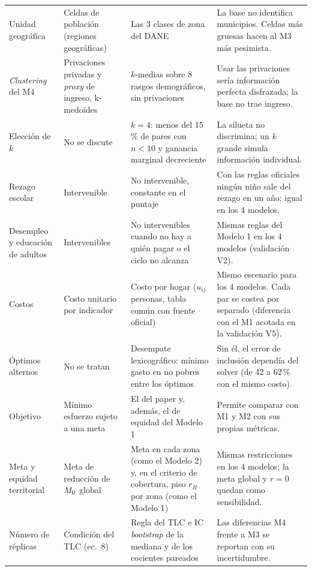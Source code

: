 {\begin{xltabular}{\textwidth}{@{}>{\raggedright\arraybackslash}p{2.3cm}>{\raggedright\arraybackslash}p{2.9cm}>{\raggedright\arraybackslash}p{3.6cm}X@{}}
Unidad geográfica & Celdas de población (regiones geográficas) & Las 3 clases de zona del DANE
  & La base no identifica municipios. Celdas más gruesas hacen al M3 más pesimista. \\
\emph{Clustering} del M4 & Privaciones privadas y \emph{proxy} de ingreso, k-medoides & $k$-medias sobre 8 rasgos demográficos, sin privaciones
  & Usar las privaciones sería información perfecta disfrazada; la base no trae ingreso. \\
Elección de $k$ & No se discute & $k=4$: menos del 15\,\% de pares con $n<10$ y ganancia marginal decreciente
  & La silueta no discrimina; un $k$ grande simula información individual. \\
Rezago escolar & Intervenible & No intervenible, constante en el puntaje
  & Con las reglas oficiales ningún niño sale del rezago en un año; igual en los 4 modelos. \\
Desempleo y educación de adultos & Intervenibles & No intervenibles cuando no hay a quién pagar o el ciclo no alcanza
  & Mismas reglas del Modelo 1 en los 4 modelos (validación V2). \\
Costos & Costo unitario por indicador & Costo por hogar ($u_{ij}$ personas, tabla común con fuente oficial)
  & Mismo escenario para los 4 modelos. Cada par se costea por separado (diferencia con el M1 acotada en la validación V5). \\
Óptimos alternos & No se tratan & Desempate lexicográfico: mínimo gasto en no pobres entre los óptimos
  & Sin él, el error de inclusión dependía del solver (de 42 a 62\,\% con el mismo costo). \\
Objetivo & Mínimo esfuerzo sujeto a una meta & El del paper y, además, el de equidad del Modelo 1
  & Permite comparar con M1 y M2 con sus propias métricas. \\
Meta y equidad territorial & Meta de reducción de $M_0$ global & Meta en cada zona (como el Modelo 2) y, en el criterio de cobertura, piso $r_B$ por zona (como el Modelo 1)
  & Mismas restricciones en los 4 modelos; la meta global y $r=0$ quedan como sensibilidad. \\
Número de réplicas & Condición del TLC (ec.~8) & Regla del TLC e IC \emph{bootstrap} de la mediana y de los cocientes pareados
  & Las diferencias M4 frente a M3 se reportan con su incertidumbre. \\
\end{xltabular}
}

